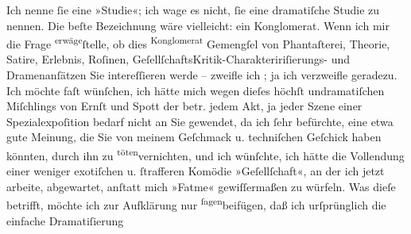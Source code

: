 \begin{ledgroupsized}[t]{13cm}
               Ich nenne ſie eine »Studie«; ich wage es nicht, ſie eine dramatiſche Studie zu
               nennen. Die beſte Bezeichnung wäre vielleicht: ein Konglomerat. Wenn ich \introOben{}mir\introOben{} die Frage \substVorne{}\textsuperscript{erwäge}{\allowbreak}\substDazwischen{}ſtelle\substHinten{}, ob dies \substVorne{}\textsuperscript{Konglomerat}{\allowbreak}\substDazwischen{} Gemengſel\substHinten{} von  Phantaſterei, \introOben{}Theorie, \introOben{}{ }Satire, \introOben{}Erlebnis\introOben{}, Roſinen,
                  \introOben{}Geſellſchafts\introOben{}Kritik-\introOben{}Charakteririſierungs-\introOben{} und Dramenanſätzen Sie intereſſieren werde –  zweifle ich ; ja ich verzweifle geradezu. Ich möchte
               faſt wünſchen, ich hätte mich \introOben{}wegen\introOben{} dieſes \introOben{}höchſt undramatiſchen\introOben{} Miſchlings von Ernſt und Spott \introOben{}der betr.  jedem Akt, ja jeder Szene  einer
                  Spezialexpoſition  bedarf\introOben{}{ } nicht an Sie gewendet, da ich ſehr befürchte,
               eine etwa gute Meinung, die Sie von meinem Geſchmack \introOben{}u.
                  techniſchen Geſchick\introOben{} haben könnten, durch
                  \introOben{}ihn\introOben{} zu \substVorne{}\textsuperscript{töten}\substDazwischen{}vernichten\substHinten{}, und ich wünſchte, ich hätte die Vollendung einer \introOben{}weniger
                  exotiſchen u. ſtrafferen\introOben{} Komödie »Geſellſchaft«, an der ich jetzt arbeite, abgewartet, anſtatt mich »Fatme« \introOben{}gewiſſermaßen\introOben{} zu
               würfeln.\pend
           \pstart
           Was dieſe betrifft, möchte ich zur Aufklärung nur \substVorne{}\textsuperscript{ſagen}\substDazwischen{}beifügen\substHinten{}, daß ich urſprünglich die \introOben{}einfache\introOben{} Dramatiſierung

\end{ledgroupsized}
